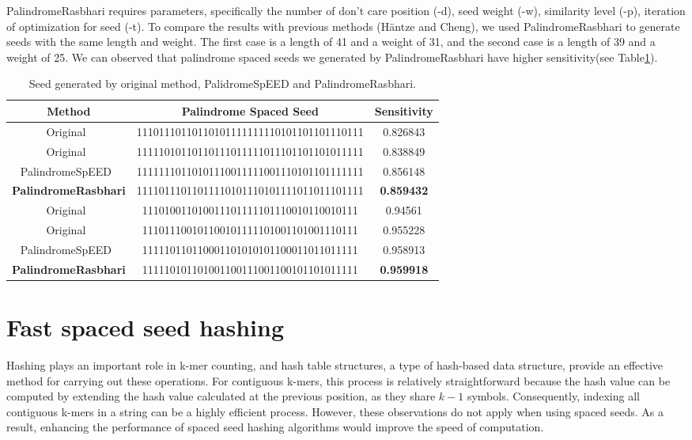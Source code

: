 \documentclass[PhD]{PHlab-thesis}
\begin{document}
PalindromeRasbhari requires parameters, specifically the number of don't care position (-d), seed weight (-w), similarity level (-p), iteration of optimization for seed (-t). To compare the results with previous methods (Häntze and Cheng), we used PalindromeRasbhari to generate seeds with the same length and weight. The first case is a length of 41 and a weight of 31, and the second case is a length of 39 and a weight of 25. We can observed that palindrome spaced seeds we generated by PalindromeRasbhari have higher sensitivity(see Table\ref{table:PalindromeRasbhari}).
\vspace{2em}
\begin{table}[h!]
	\centering
	\begin{tabular*}{\textwidth}{@{\extracolsep{\fill}}ccc@{\extracolsep{\fill}}}
        \toprule
        Method & Palindrome Spaced Seed & Sensitivity\\
        \midrule
        Original~\cite{haimo2023MaskedPanGenie}&11101110110110101111111110101101101110111&0.826843\\
        Original~\cite{haimo2023MaskedPanGenie}&11111010110110111011111011101101101011111&0.838849\\
        PalindromeSpEED~\cite{garyMaskedPanGenie}&11111110110101110011111001110101101111111&0.856148\\
        \textbf{PalindromeRasbhari} &11110111011011110101110101111011011101111&\textbf{0.859432}\\
        \midrule 
        Original~\cite{haimo2023MaskedPanGenie}&111010011010011101111101110010110010111&0.94561\\
        Original~\cite{haimo2023MaskedPanGenie}&111011100101100101111101001101001110111&0.955228\\
        PalindromeSpEED~\cite{garyMaskedPanGenie}&111110110110001101010101100011011011111&0.958913\\
        \textbf{PalindromeRasbhari} &111110101101001100111001100101101011111&\textbf{0.959918}\\
        \bottomrule 
	\end{tabular*}
	\caption{Seed generated by original method, PalidromeSpEED and PalindromeRasbhari.}
	\label{table:PalindromeRasbhari}
\end{table}

\section{Fast spaced seed hashing}
Hashing plays an important role in k-mer counting, and hash table structures, a type of hash-based data structure, provide an effective method for carrying out these operations. For contiguous k-mers, this process is relatively straightforward because the hash value can be computed by extending the hash value calculated at the previous position, as they share  $k-1$  symbols. Consequently, indexing all contiguous k-mers in a string can be a highly efficient process. However, these observations do not apply when using spaced seeds. As a result, enhancing the performance of spaced seed hashing algorithms would improve the speed of computation. 
\end{document}
